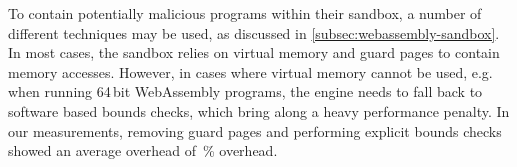 To contain potentially malicious programs within their sandbox, a number of different techniques may be used, as discussed in \cref{subsec:webassembly-sandbox}.
In most cases, the sandbox relies on virtual memory and guard pages to contain memory accesses.
However, in cases where virtual memory cannot be used, e.g. when running 64\,bit WebAssembly programs, the engine needs to fall back to software based bounds checks, which bring along a heavy performance penalty.
In our measurements, removing guard pages and performing explicit bounds checks showed an average overhead of \,\% overhead.

